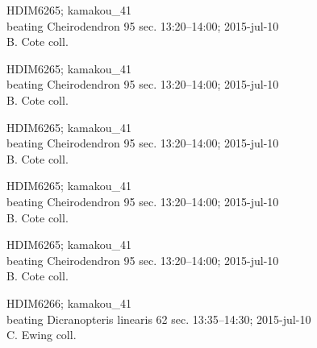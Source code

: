 \documentclass[2pt]{extarticle}
\begin{document}
\noindent
\parbox{0.16\textwidth}{\tiny \raggedright \rule[-0.3\baselineskip]{0pt}{10pt}HDIM6265; kamakou\_41\\ beating Cheirodendron 95 sec. 13:20--14:00; 2015-jul-10\\ B. Cote coll.}
\parbox{0.16\textwidth}{\tiny \raggedright \rule[-0.3\baselineskip]{0pt}{10pt}HDIM6265; kamakou\_41\\ beating Cheirodendron 95 sec. 13:20--14:00; 2015-jul-10\\ B. Cote coll.}
\parbox{0.16\textwidth}{\tiny \raggedright \rule[-0.3\baselineskip]{0pt}{10pt}HDIM6265; kamakou\_41\\ beating Cheirodendron 95 sec. 13:20--14:00; 2015-jul-10\\ B. Cote coll.}
\parbox{0.16\textwidth}{\tiny \raggedright \rule[-0.3\baselineskip]{0pt}{10pt}HDIM6265; kamakou\_41\\ beating Cheirodendron 95 sec. 13:20--14:00; 2015-jul-10\\ B. Cote coll.}
\parbox{0.16\textwidth}{\tiny \raggedright \rule[-0.3\baselineskip]{0pt}{10pt}HDIM6265; kamakou\_41\\ beating Cheirodendron 95 sec. 13:20--14:00; 2015-jul-10\\ B. Cote coll.}
\parbox{0.16\textwidth}{\tiny \raggedright \rule[-0.3\baselineskip]{0pt}{10pt}HDIM6266; kamakou\_41\\ beating Dicranopteris linearis 62 sec. 13:35--14:30; 2015-jul-10\\ C. Ewing coll.} \\ 
\vspace{0.001in} 
\end{document}
